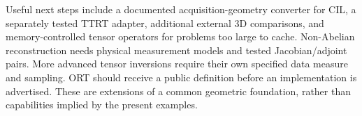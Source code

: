 \documentclass[11pt,a4paper]{article}
\begin{document}
Useful next steps include a documented acquisition-geometry converter for
CIL, a separately tested TTRT adapter, additional external 3D comparisons,
and memory-controlled tensor operators for problems too large to cache.
Non-Abelian reconstruction needs physical measurement models and tested
Jacobian/adjoint pairs. More advanced tensor inversions require their own
specified data measure and sampling. ORT should receive a public definition
before an implementation is advertised. These are extensions of a common
geometric foundation, rather than capabilities implied by the present
examples.

\clearpage
\appendix


\clearpage
{}
{}


\end{document}
